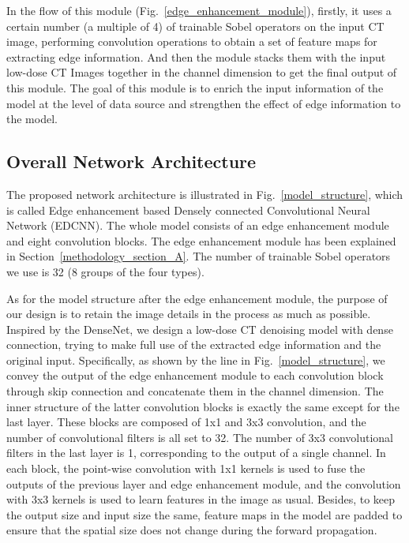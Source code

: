 \documentclass[conference]{IEEEtran}
\begin{document}
            In the flow of this module (Fig.~\ref{edge_enhancement_module}), firstly, it uses a certain number (a multiple of 4) of trainable Sobel operators on the input CT image, performing convolution operations to obtain a set of feature maps for extracting edge information.
            And then the module stacks them with the input low-dose CT Images together in the channel dimension to get the final output of this module. 
            The goal of this module is to enrich the input information of the model at the level of data source and strengthen the effect of edge information to the model.

        \subsection{Overall Network Architecture} \label{methodology_section_B}
            The proposed network architecture is illustrated in Fig.~\ref{model_structure}, which is called Edge enhancement based Densely connected Convolutional Neural Network (EDCNN).
            The whole model consists of an edge enhancement module and eight convolution blocks. 
            The edge enhancement module has been explained in Section~\ref{methodology_section_A}. 
            The number of trainable Sobel operators we use is 32 (8 groups of the four types).
            
            As for the model structure after the edge enhancement module, the purpose of our design is to retain the image details in the process as much as possible. 
            Inspired by the DenseNet\cite{huang2016densely}, we design a low-dose CT denoising model with dense connection, trying to make full use of the extracted edge information and the original input.
            Specifically, as shown by the line in Fig.~\ref{model_structure}, we convey the output of the edge enhancement module to each convolution block through skip connection and concatenate them in the channel dimension.
            The inner structure of the latter convolution blocks is exactly the same except for the last layer.
            These blocks are composed of 1x1 and 3x3 convolution, and the number of convolutional filters is all set to 32.
            The number of 3x3 convolutional filters in the last layer is 1, corresponding to the output of a single channel. 
            In each block, the point-wise convolution with 1x1 kernels is used to fuse the outputs of the previous layer and edge enhancement module, and the convolution with 3x3 kernels is used to learn features in the image as usual.
            Besides, to keep the output size and input size the same, feature maps in the model are padded to ensure that the spatial size does not change during the forward propagation.
\end{document}
